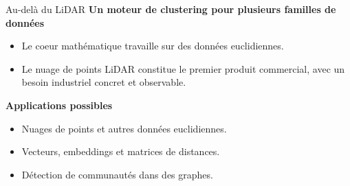 \documentclass[A4,svgnames,10pt,aspectratio=169,usepdftitle=false]{beamer}
\begin{document}
\begin{frame}{Au-delà du LiDAR}
    \textbf{\bleu Un moteur de clustering pour plusieurs familles de données}
    \begin{itemize}
        \item Le coeur mathématique travaille sur des données euclidiennes.
        \item Le nuage de points LiDAR constitue le premier produit commercial, avec un besoin industriel concret et observable.
    \end{itemize}

    \vspace{0.25cm}
    \textbf{\orange Applications possibles}
    \begin{itemize}
        \item Nuages de points et autres données euclidiennes.
        \item Vecteurs, embeddings et matrices de distances.
        \item Détection de communautés dans des graphes.
    \end{itemize}
\end{frame}
\end{document}
